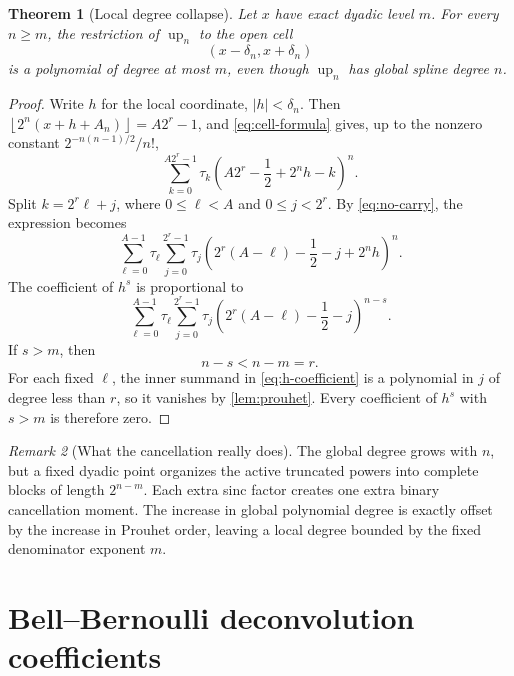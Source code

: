 \documentclass[11pt,oneside]{article}
\newtheorem{theorem}{Theorem}[section]
\theoremstyle{definition}
\theoremstyle{remark}
\newtheorem{remark}[theorem]{Remark}
\newcommand{\up}{\operatorname{up}}
\newcommand{\abs}[1]{\left\lvert#1\right\rvert}
\newcommand{\floor}[1]{\left\lfloor#1\right\rfloor}
\begin{document}
\begin{theorem}[Local degree collapse]\label{thm:degree-collapse}
Let \(x\) have exact dyadic level \(m\).  For every \(n\ge m\), the
restriction of \(\up_n\) to the open cell
\begin{equation}\label{eq:center-cell}
 (x-\delta_n,x+\delta_n)
\end{equation}
is a polynomial of degree at most \(m\), even though \(\up_n\) has global
spline degree \(n\).
\end{theorem}

\begin{proof}
Write \(h\) for the local coordinate, \(\abs h<\delta_n\).  Then
\(\floor{2^n(x+h+A_n)}=A2^r-1\), and \eqref{eq:cell-formula} gives, up to the
nonzero constant \(2^{-n(n-1)/2}/n!\),
\begin{equation}\label{eq:block-before}
 \sum_{k=0}^{A2^r-1}\tau_k
 \left(A2^r-\frac12+2^nh-k\right)^n.
\end{equation}
Split \(k=2^r\ell+j\), where \(0\le\ell<A\) and \(0\le j<2^r\).  By
\eqref{eq:no-carry}, the expression becomes
\begin{equation}\label{eq:block-after}
 \sum_{\ell=0}^{A-1}\tau_\ell
 \sum_{j=0}^{2^r-1}\tau_j
 \left(2^r(A-\ell)-\frac12-j+2^nh\right)^n.
\end{equation}
The coefficient of \(h^s\) is proportional to
\begin{equation}\label{eq:h-coefficient}
 \sum_{\ell=0}^{A-1}\tau_\ell
 \sum_{j=0}^{2^r-1}\tau_j
 \left(2^r(A-\ell)-\frac12-j\right)^{n-s}.
\end{equation}
If \(s>m\), then
\[
 n-s<n-m=r.
\]
For each fixed \(\ell\), the inner summand in \eqref{eq:h-coefficient} is a
polynomial in \(j\) of degree less than \(r\), so it vanishes by
\cref{lem:prouhet}.  Every coefficient of \(h^s\) with \(s>m\) is therefore
zero.
\end{proof}

\begin{remark}[What the cancellation really does]
The global degree grows with \(n\), but a fixed dyadic point organizes the
active truncated powers into complete blocks of length \(2^{n-m}\).  Each
extra sinc factor creates one extra binary cancellation moment.  The increase
in global polynomial degree is exactly offset by the increase in Prouhet
order, leaving a local degree bounded by the fixed denominator exponent
\(m\).
\end{remark}

\section{Bell--Bernoulli deconvolution coefficients}
\end{document}

